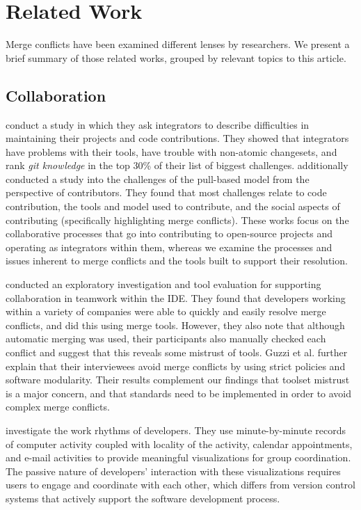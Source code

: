 
\section{Related Work}\label{related_work}

Merge conflicts have been examined different lenses by researchers. We present a brief summary of those related works, grouped by relevant topics to this article.

\subsection{Collaboration}

\citet{integrator_perspective} conduct a study in which they ask integrators to describe difficulties in maintaining their projects and code contributions. 
They showed that integrators have problems with their tools, have trouble with non-atomic changesets, and rank \textit{git knowledge} in the top 30\% of their list of biggest challenges. 
\citet{gousios2016work} additionally conducted a study into the challenges of the pull-based model from the perspective of contributors. 
They found that most challenges relate to code contribution, the tools and model used to contribute, and the social aspects of contributing (specifically highlighting merge conflicts).
These works focus on the collaborative processes that go into contributing to open-source projects and operating as integrators within them, whereas we examine the processes and issues inherent to merge conflicts and the tools built to support their resolution.

\citet{Guzzi2015} conducted an exploratory investigation and tool evaluation for supporting collaboration in teamwork within the IDE.
They found that developers working within a variety of companies were able to quickly and easily resolve merge conflicts, and did this using merge tools.
However, they also note that although automatic merging was used, their participants also manually checked each conflict and suggest that this reveals some mistrust of tools.
Guzzi et al. further explain that their interviewees avoid merge conflicts by using strict policies and software modularity.
Their results complement our findings that toolset mistrust is a major concern, and that standards need to be implemented in order to avoid complex merge conflicts.

\citet{begole_work_2002} investigate the work rhythms of developers.
They use minute-by-minute records of computer activity coupled with locality of the activity, calendar appointments, and e-mail activities to provide meaningful visualizations for group coordination.
The passive nature of developers' interaction with these visualizations requires users to engage and coordinate with each other, which differs from version control systems that actively support the software development process.


